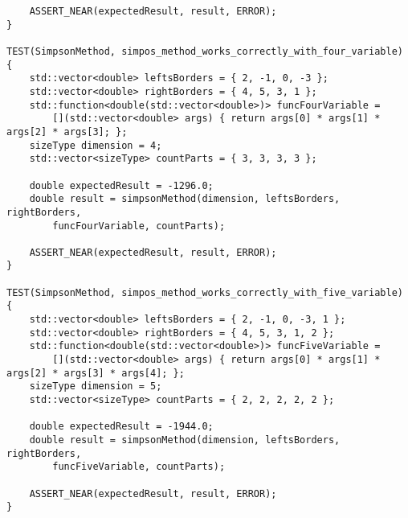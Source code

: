 \documentclass{report}
\begin{document}
\begin{lstlisting}
    ASSERT_NEAR(expectedResult, result, ERROR);
}

TEST(SimpsonMethod, simpos_method_works_correctly_with_four_variable) {
    std::vector<double> leftsBorders = { 2, -1, 0, -3 };
    std::vector<double> rightBorders = { 4, 5, 3, 1 };
    std::function<double(std::vector<double>)> funcFourVariable =
        [](std::vector<double> args) { return args[0] * args[1] * args[2] * args[3]; };
    sizeType dimension = 4;
    std::vector<sizeType> countParts = { 3, 3, 3, 3 };

    double expectedResult = -1296.0;
    double result = simpsonMethod(dimension, leftsBorders, rightBorders,
        funcFourVariable, countParts);

    ASSERT_NEAR(expectedResult, result, ERROR);
}

TEST(SimpsonMethod, simpos_method_works_correctly_with_five_variable) {
    std::vector<double> leftsBorders = { 2, -1, 0, -3, 1 };
    std::vector<double> rightBorders = { 4, 5, 3, 1, 2 };
    std::function<double(std::vector<double>)> funcFiveVariable =
        [](std::vector<double> args) { return args[0] * args[1] * args[2] * args[3] * args[4]; };
    sizeType dimension = 5;
    std::vector<sizeType> countParts = { 2, 2, 2, 2, 2 };

    double expectedResult = -1944.0;
    double result = simpsonMethod(dimension, leftsBorders, rightBorders,
        funcFiveVariable, countParts);

    ASSERT_NEAR(expectedResult, result, ERROR);
}

\end{lstlisting}
\end{document}
